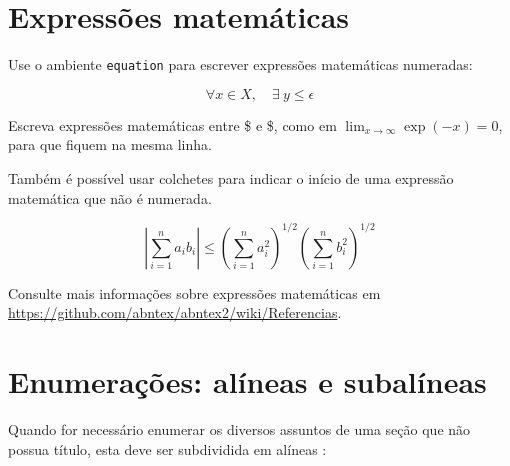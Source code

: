 \section{Expressões matemáticas}

Use o ambiente \texttt{equation} para escrever
expressões matemáticas numeradas:

\begin{equation}
  \forall x \in X, \quad \exists \: y \leq \epsilon
\end{equation}

Escreva expressões matemáticas entre \$ e \$, como em $ \lim_{x \to \infty}
\exp(-x) = 0 $, para que fiquem na mesma linha.

Também é possível usar colchetes para indicar o início de uma expressão
matemática que não é numerada.

\[
\left|\sum_{i=1}^n a_ib_i\right|
\le
\left(\sum_{i=1}^n a_i^2\right)^{1/2}
\left(\sum_{i=1}^n b_i^2\right)^{1/2}
\]

Consulte mais informações sobre expressões matemáticas em
\url{https://github.com/abntex/abntex2/wiki/Referencias}.

\section{Enumerações: alíneas e subalíneas}

Quando for necessário enumerar
os diversos assuntos de uma seção que não possua título, esta deve ser
subdividida em alíneas \cite[4.2]{NBR6024:2012}:

